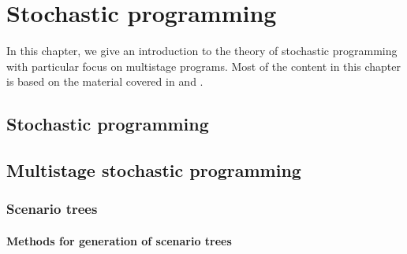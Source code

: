 \chapter{Stochastic programming}


%
%

	
In this chapter, we give an introduction to the theory of stochastic programming with particular focus on multistage programs. Most of the content in this chapter is based on the material covered in \cite[Chapter 1]{stochasticprogrammingbible} and \cite[Chapters 1-3]{stochasticprogrammingbible2009}.

\section{Stochastic programming}

\section{Multistage stochastic programming}
\subsection{Scenario trees}
\subsubsection{Methods for generation of scenario trees}